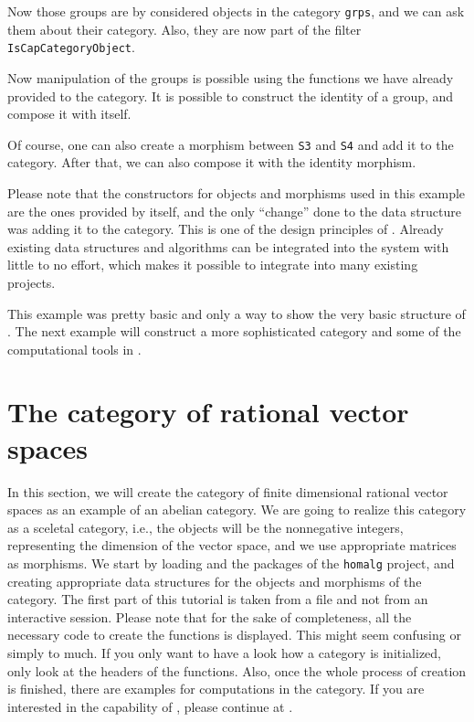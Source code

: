 

Now those groups are by \CapPkg considered objects in the category \texttt{grps}, and we can
ask them about their category. Also, they are now part of the \GAP filter \texttt{IsCapCategoryObject}.



Now manipulation of the groups is possible using the functions we have already provided to the category.
It is possible to construct the identity of a group, and compose it with itself.



Of course, one can also create a morphism between \texttt{S3} and \texttt{S4} and add it to the category.
After that, we can also compose it with the identity morphism.



Please note that the constructors for objects and morphisms used in this example are the ones provided
by \GAP itself, and the only ``change'' done to the data structure was adding it to the category.
This is one of the design principles of \CapPkg. Already existing data structures and algorithms
can be integrated into the system with little to no effort, which makes it possible to integrate \CapPkg
into many existing projects.

This example was pretty basic and only a way to show the very basic structure of \CapPkg. The next example
will construct a more sophisticated category and some of the computational tools in \CapPkg.


\section{The category of rational vector spaces}

In this section, we will create the category of finite dimensional rational vector spaces as an
example of an abelian category. We are going
to realize this category as a sceletal category, i.e., the objects will be the nonnegative integers,
representing the dimension of the vector space, and we use appropriate matrices as morphisms. We start
by loading \CapPkg and the packages of the \texttt{homalg} project, and creating appropriate data structures
for the objects and morphisms of the category. The first part of this tutorial is taken from a file and not from
an interactive session. Please note that for the sake of completeness, all the necessary code to create the
functions is displayed. This might seem confusing or simply to much. If you only want to have a look how a \CapPkg category
is initialized, only look at the headers of the functions. Also, once the whole process of creation is finished,
there are examples for computations in the category. If you are interested in the capability of \CapPkg, please
continue at .

